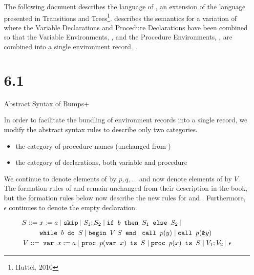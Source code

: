 






The following document describes the language of , an extension of the language  presented in Transitions and Trees\footnote{Huttel, 2010}.  describes the semantics for a variation of  where the Variable Declarations and Procedure Declarations have been combined so that the Variable Environments, , and the Procedure Environments, , are combined into a single environment record, .

\section{6.1}{Abstract Syntax of Bumps+}

In order to facilitate the bundling of environment records into a single record, we modify the abstract syntax rules to describe only two categories.

\begin{itemize}
    \item {} the category of procedure names (unchanged from )
    \item {} the category of declarations, both variable and procedure
\end{itemize}

We continue to denote elements of  by $p,q,...$ and now denote elements of  by $V$. The formation rules of  and  remain unchanged from their description in the book, but the formation rules below now describe the new rules for  and . Furthermore, $\epsilon$ continues to denote the empty declaration.

\begin{align*}
    S ::=\;& x := a \;|\; \texttt{skip} \;|\; S_1;S_2 \;|\; \texttt{if } b \texttt{ then } S_1 \texttt{ else } S_2 \;|\; \\
    &\texttt{while } b \texttt{ do } S \;|\; \texttt{begin } V \; S \texttt{ end} \;|\; \texttt{call } p(y) \;|\; \texttt{{call }} p(\texttt{{\&}}y)\\
    V ::=& \texttt{ var } x := a \;|\; \texttt{proc } p(\texttt{{var }} x) \texttt{ is } S \;|\; \texttt{{proc }} p(x) \texttt{{ is }} S \;|\; V_1 ; V_2 \;|\; \epsilon
\end{align*}

